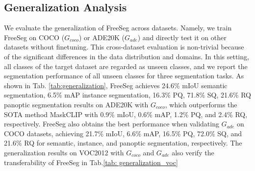 \documentclass[10pt,twocolumn,letterpaper]{article}
\begin{document}
\begin{table}[tp]
    \centering
    \small
      \vspace{-8pt}
    \caption{Generalization performance (in\%)  of the open vocabulary semantic segmentation on VOC2012 datasets.}
      \vspace{-8pt}
    \begin{threeparttable}
        \end{threeparttable}
        \label{tab: generalization_voc}
\end{table}  




\subsection{Generalization Analysis}
We evaluate the generalization of FreeSeg across datasets. Namely, we train FreeSeg on COCO ($G_{coco}$) or ADE20K ($G_{ade}$) and directly test it on other datasets without finetuning.
This cross-dataset evaluation is non-trivial because of the significant differences in the data distribution and domains. 
In this setting, all classes of the target dataset are regarded as unseen classes, and we report the segmentation performance of all unseen classes for three segmentation tasks.
As shown in Tab. \ref{tab:generalization}, FreeSeg achieves 24.6\% mIoU semantic segmentation, 6.5\% mAP instance segmentation, 16.3\% PQ, 71.8\% SQ, 21.6\% RQ panoptic segmentation results on ADE20K with $G_{coco}$, which outperforms the SOTA method MaskCLIP\cite{ding2022open} with 0.9\% mIoU, 0.6\% mAP, 1.2\% PQ, and 2.4\% RQ, respectively. 
FreeSeg also obtains the best performance when validating $G_{ade}$ on COCO  datasets, achieving 21.7\% mIoU, 6.6\% mAP, 16.5\% PQ, 72.0\% SQ, and 21.6\% RQ for semantic, instance, and panoptic segmentation, respectively. 
The generalization results on VOC2012  with $G_{coco}$  and $G_{ade}$ also verify the transferability of FreeSeg in Tab.\ref{tab: generalization_voc}
\end{document}
